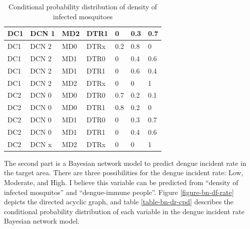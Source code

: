\documentclass[review]{elsarticle}
\begin{document}
\begin{table}[!htbp]
\begin{tabular}{|l|l|l|l|l|l|l|}
			\hline
			DC1 & DCN 1 & MD2 & DTR1 & 0 & 0.3 & 0.7\\
			\hline
			DC1 & DCN 2 & MD0 & DTRx & 0.2 & 0.8 & 0\\
			\hline
			DC1 & DCN 2 & MD1 & DTR0 & 0 & 0.4 & 0.6\\
			\hline
			DC1 & DCN 2 & MD1 & DTR1 & 0 & 0.6 & 0.4\\
			\hline
			DC1 & DCN 2 & MD2 & DTRx & 0 & 0 & 1\\
			\hline
			DC2 & DCN 0 & MD0 & DTR0 & 0.7 & 0.2 & 0.1\\
			\hline
			DC2 & DCN 0 & MD0 & DTR1 & 0.8 & 0.2 & 0\\
			\hline
			DC2 & DCN 0 & MD1 & DTR0 & 0 & 0.3 & 0.7\\
			\hline
			DC2 & DCN 0 & MD1 & DTR1 & 0 & 0.4 & 0.6\\
			\hline
			DC2 & DCN x & MD2 & DTRx & 0 & 0 & 1\\
			\hline
		\end{tabular}
		\caption{Conditional probability distribution of density of infected mosquitoes}
	\end{table}














The second part is a Bayesian network model to predict dengue incident rate in the target area. There are three possibilities for the dengue incident rate: Low, Moderate, and High. I believe this variable can be predicted from “density of infected mosquitos” and “dengue-immune people”. Figure \ref{figure-bn-df-rate} depicts the directed acyclic graph, and table \ref{table-bn-dr-cpd} describes the conditional probability distribution of each variable in the dengue incident rate Bayesian network model. 
\end{document}
